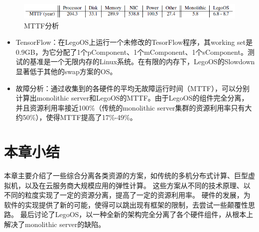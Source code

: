 \begin{figure}[h]
\centering
\includegraphics[scale=0.75]{Figures/system/failure_analysis.png}
\decoRule
\caption{MTTF分析}    %
\label{fig:failure_analysis}
\end{figure}

\begin{itemize}
\item TensorFlow：在LegoOS上运行一个未修改的TesorFlow程序，其working set是0.9GB，为它分配了1个pComponent、1个mComponent、1个sComponent。测试的基准是一个无限内存的Linux系统。在有限的内存下，LegoOS的Slowdown显著低于其他的swap方案的OS。
\item 故障分析：通过收集到的各硬件的平均无故障运行时间（MTTF），可以分别计算出monolithic server和LegoOS的MTTF。由于LegoOS的组件完全分离，并且资源利用率接近100\%（传统的monolithic server集群的资源利用率只有大约50\%），使得MTTF提高了17\%-49\%。
\end{itemize}


\section{本章小结}

本章主要介绍了一些综合分离各类资源的方案，如传统的多机分布式计算、巨型虚拟机，以及在云服务商大规模应用的弹性计算。
这些方案从不同的技术原理、以不同的粒度实现了一定的资源分离，提高了一定的资源利用率。
硬件的发展，为软件的实现提供了新的可能，使得可以跳出现有框架的限制，去尝试一些颠覆性思路。
最后讨论了LegoOS，以一种全新的架构完全分离了各个硬件组件，从根本上解决了monolithic server的缺陷。
